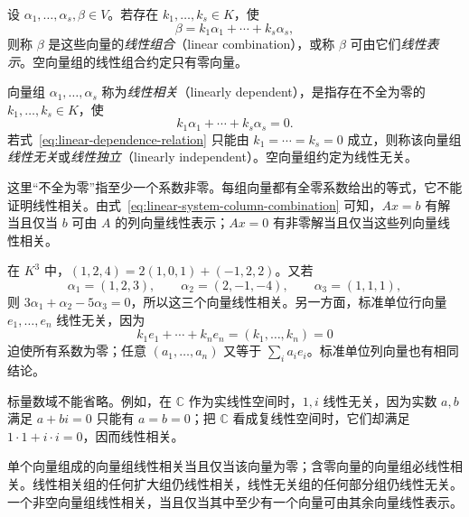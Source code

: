 \begin{definition}
\label{def:linear-combination}
设 $\alpha_1,\ldots,\alpha_s,\beta\in V$。若存在 $k_1,\ldots,k_s\in K$，使
\[
    \beta=k_1\alpha_1+\cdots+k_s\alpha_s,
\]
则称 $\beta$ 是这些向量的\emph{线性组合}（linear combination），或称 $\beta$ 可由它们\emph{线性表示}。空向量组的线性组合约定只有零向量。
\end{definition}

\begin{definition}
\label{def:linear-dependence}
向量组 $\alpha_1,\ldots,\alpha_s$ 称为\emph{线性相关}（linearly dependent），是指存在不全为零的 $k_1,\ldots,k_s\in K$，使
\begin{equation}
\label{eq:linear-dependence-relation}
    k_1\alpha_1+\cdots+k_s\alpha_s=0.
\end{equation}
若式~\eqref{eq:linear-dependence-relation} 只能由 $k_1=\cdots=k_s=0$ 成立，则称该向量组\emph{线性无关}或\emph{线性独立}（linearly independent）。空向量组约定为线性无关。
\end{definition}

这里“不全为零”指至少一个系数非零。每组向量都有全零系数给出的等式，它不能证明线性相关。由式~\eqref{eq:linear-system-column-combination} 可知，$Ax=b$ 有解当且仅当 $b$ 可由 $A$ 的列向量线性表示；$Ax=0$ 有非零解当且仅当这些列向量线性相关。

\begin{example}
\label{ex:linear-relations-elementary}
在 $K^3$ 中，$(1,2,4)=2(1,0,1)+(-1,2,2)$。又若
\[
    \alpha_1=(1,2,3),\qquad \alpha_2=(2,-1,-4),\qquad
    \alpha_3=(1,1,1),
\]
则 $3\alpha_1+\alpha_2-5\alpha_3=0$，所以这三个向量线性相关。另一方面，标准单位行向量 $e_1,\ldots,e_n$ 线性无关，因为
\[
    k_1e_1+\cdots+k_ne_n=(k_1,\ldots,k_n)=0
\]
迫使所有系数为零；任意 $(a_1,\ldots,a_n)$ 又等于 $\sum_i a_ie_i$。标准单位列向量也有相同结论。
\end{example}

标量数域不能省略。例如，在 $\mathbb C$ 作为实线性空间时，$1,i$ 线性无关，因为实数 $a,b$ 满足 $a+bi=0$ 只能有 $a=b=0$；把 $\mathbb C$ 看成复线性空间时，它们却满足 $1\cdot1+i\cdot i=0$，因而线性相关。

\begin{proposition}
\label{prop:dependence-basic-criteria}
单个向量组成的向量组线性相关当且仅当该向量为零；含零向量的向量组必线性相关。线性相关组的任何扩大组仍线性相关，线性无关组的任何部分组仍线性无关。一个非空向量组线性相关，当且仅当其中至少有一个向量可由其余向量线性表示。
\end{proposition}


